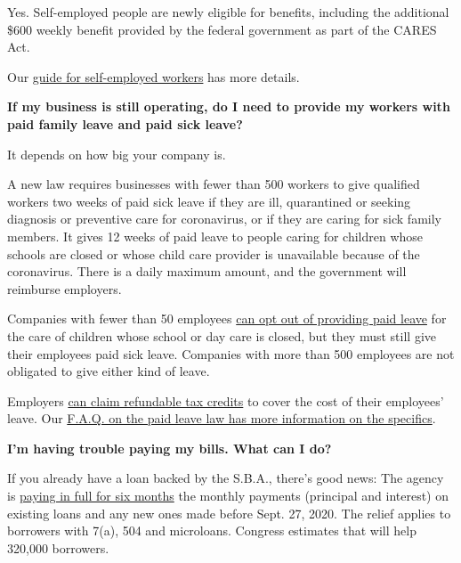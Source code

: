 Yes. Self-employed people are newly eligible for benefits, including the
additional \$600 weekly benefit provided by the federal government as
part of the CARES Act.

Our
\href{https://www.nytimes3xbfgragh.onion/article/self-employed-workers-unemployment-coronavirus-stimulus-package.html}{guide
for self-employed workers} has more details.

\textbf{If my business is still operating, do I need to provide my
workers with paid family leave and paid sick leave?}

It depends on how big your company is.

A new law requires businesses with fewer than 500 workers to give
qualified workers two weeks of paid sick leave if they are ill,
quarantined or seeking diagnosis or preventive care for coronavirus, or
if they are caring for sick family members. It gives 12 weeks of paid
leave to people caring for children whose schools are closed or whose
child care provider is unavailable because of the coronavirus. There is
a daily maximum amount, and the government will reimburse employers.

Companies with fewer than 50 employees
\href{https://www.nytimes3xbfgragh.onion/2020/04/02/us/politics/coronavirus-paid-leave.html}{can
opt out of providing paid leave} for the care of children whose school
or day care is closed, but they must still give their employees paid
sick leave. Companies with more than 500 employees are not obligated to
give either kind of leave.

Employers
\href{https://www.irs.gov/newsroom/covid-19-related-tax-credits-for-required-paid-leave-provided-by-small-and-midsize-businesses-faqs}{can
claim refundable tax credits} to cover the cost of their employees'
leave. Our
\href{https://www.nytimes3xbfgragh.onion/2020/03/19/upshot/coronavirus-paid-leave-guide.html}{F.A.Q.
on the paid leave law has more information on the specifics}.

\textbf{I'm having trouble paying my bills. What can I do?}

If you already have a loan backed by the S.B.A., there's good news: The
agency is
\href{https://www.sba.gov/funding-programs/loans/coronavirus-relief-options/sba-debt-relief}{paying
in full for six months} the monthly payments (principal and interest) on
existing loans and any new ones made before Sept. 27, 2020. The relief
applies to borrowers with 7(a), 504 and microloans. Congress estimates
that will help 320,000 borrowers.

